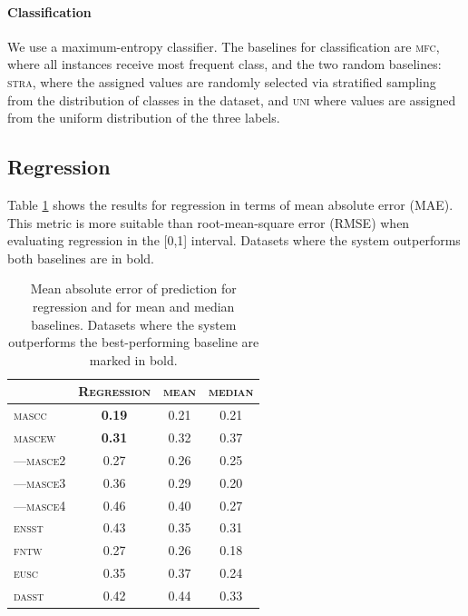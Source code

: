 \documentclass[11pt,a4paper]{article}
\begin{document}
\paragraph{Classification} We use a maximum-entropy classifier. The baselines for classification are \textsc{mfc}, where all instances receive most frequent class, and the two random baselines: \textsc{stra}, where the assigned values are randomly selected via stratified sampling from the distribution of classes in the dataset, and \textsc{uni} where values are assigned from the uniform distribution of the three labels. 

\subsection{Regression}
\label{sec:reg}
Table \ref{tab:regagr_results} shows the results for regression in terms of mean absolute error (MAE). This metric is more suitable than root-mean-square error (RMSE) when evaluating regression in the [0,1] interval. Datasets where the system outperforms both baselines are in bold.


\begin{table}[Ht!]

\begin{center}
  \begin{tabular}{lc|cc}
 \toprule
 & \textsc{Regression} & \textsc{mean} & \textsc{median} \\
 \midrule
 \textsc{mascc} & \textbf{0.19} & 0.21 & 0.21 \\
 \textsc{mascew} & \textbf{0.31} & 0.32 & 0.37 \\
---\textsc{masce2} & {0.27} & 0.26 & 0.25 \\
---\textsc{masce3} & {0.36} & 0.29 & 0.20 \\
---\textsc{masce4} & {0.46} & 0.40 & 0.27 \\
\textsc{ensst} & {0.43} & 0.35 & 0.31 \\
\textsc{fntw} & {0.27} & 0.26 & 0.18 \\

\textsc{eusc} & 0.35 & 0.37 & 0.24 \\
\textsc{dasst} & 0.42 & 0.44 & 0.33 \\

\bottomrule

  \end{tabular}  
\end{center}
\caption{Mean absolute error of prediction for regression and for mean and median baselines. Datasets where the system outperforms the best-performing baseline are marked in bold. \label{tab:regagr_results}}
\end{table} 
\end{document}

